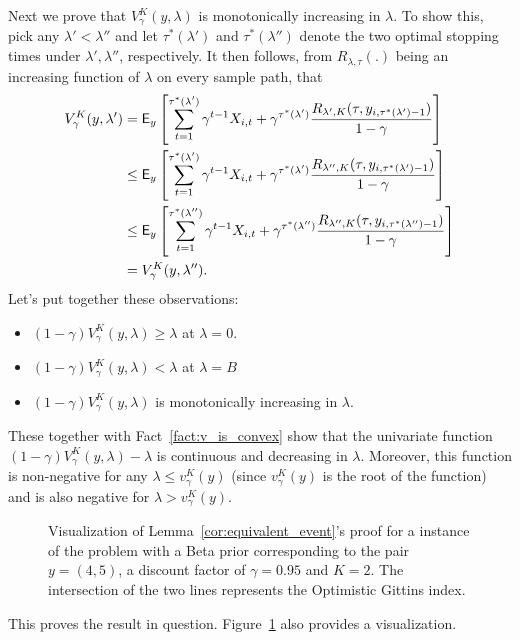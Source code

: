 {\begin{myproof}[Proof.]
	Next we prove that $V^K_\gamma(y, \lambda)$ is monotonically increasing in $\lambda$. To show this, pick any $\lambda' < \lambda''$ and let $\tau^*(\lambda')$ and $\tau^*(\lambda'')$ denote the two optimal stopping times under $\lambda', \lambda''$, respectively. It then follows, from $R_{\lambda,\tau}(.)$ being an increasing function of $\lambda$ on every sample path, that
	\begin{align*}
	V^K_{\gamma}(y, \lambda') & = \mathsf{E}_y\left[\sum_{t=1}^{\tau^*(\lambda')} \gamma^{t-1}  X_{i,t} + \gamma^{\tau^*(\lambda')} \frac{R_{\lambda', K}(\tau, y_{i,\tau^*(\lambda')-1})}{1-\gamma}\right] \\
	& \leq \mathsf{E}_y\left[\sum_{t=1}^{\tau^*(\lambda')} \gamma^{t-1}  X_{i,t} + \gamma^{\tau^*(\lambda')} \frac{R_{\lambda'', K}(\tau, y_{i,\tau^*(\lambda')-1})}{1-\gamma}\right] \\
	& \leq \mathsf{E}_y\left[\sum_{t=1}^{\tau^*(\lambda'')} \gamma^{t-1}  X_{i,t} + \gamma^{\tau^*(\lambda'')} \frac{R_{\lambda'', K}(\tau, y_{i,\tau^*(\lambda'')-1})}{1-\gamma}\right] \\
	& = V^K_{\gamma}(y, \lambda'').
	\end{align*}
	Let's put together these observations:
	\begin{itemize}
		\item $(1-\gamma)V^{K}_\gamma(y, \lambda) \ge \lambda $ at $\lambda = 0$.
		\item   $(1-\gamma)V^{K}_\gamma(y, \lambda) < \lambda $ at $\lambda = B$
		\item $(1-\gamma)V^{K}_\gamma(y, \lambda)$ is monotonically increasing in $\lambda$.
	\end{itemize}
	These together with Fact~\ref{fact:v_is_convex} show that the univariate function  $(1-\gamma)V^K_\gamma(y, \lambda) - \lambda$ is continuous and decreasing in $\lambda$. Moreover, this function is non-negative for any $\lambda \le v^K_\gamma(y)$ (since $v^K_\gamma(y)$ is the root of the function) and is also negative for $\lambda > v^K_\gamma(y)$.
	\begin{figure}
		\centering
		 
		\caption{Visualization of Lemma~\ref{cor:equivalent_event}'s proof for a instance of the problem with a Beta prior corresponding to the pair $y = (4,5)$, a discount factor of $\gamma=0.95$ and $K = 2$. The intersection of the two lines represents the Optimistic Gittins index.}
		\label{fig:visaulize_gx_proof}
	\end{figure}
	This proves the result in question. Figure~\ref{fig:visaulize_gx_proof} also provides a visualization.
\end{myproof}
}


